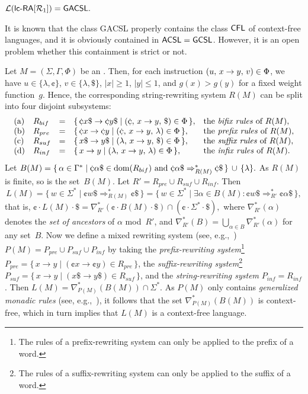 \begin{theorem}\label{PropR1b}
${\mathcal L}(\lcRA[1]) = {\sf GACSL}.$
\end{theorem}

It is known that the class {\sf GACSL} properly contains the class $\textup{\sf CFL}$ of context-free languages, and it is obviously contained in ${\sf ACSL} = \textup{\sf GCSL}$. However, it is an open problem whether this containment is strict or not.
\vspace{+0.1cm}

Let $M = (\Sigma,\Gamma,\Phi)$ be an \lcRA[2']. Then, for each instruction $(u,\,x\rightarrow y,\,v)\in \Phi$, we have $u\in\{\lambda,\cent\}$, $v\in\{\lambda,\$\}$, $|x|\ge 1$, $|y|\le 1$, and $g(x)>g(y)$ for a fixed weight function~$g$. Hence, the corresponding string-rewriting system $R(M)$ can be split into four disjoint subsystems:
$$\begin{array}{llcll}
{\rm (a)} & R_{bif} & = & \{\,\cent x\$ \to \cent y\$ \mid \rarule{\cent}{x}{y}{\$}\in \Phi\,\}, & \textup{the \emph{bifix rules} of }R(M),\\
{\rm (b)} & R_{pre}& = & \{\,\cent x \to \cent y \mid \rarule{\cent}{x}{y}{\lambda}\in \Phi\,\}, & \textup{the \emph{prefix rules} of }R(M),\\
{\rm (c)} & R_{suf}& = & \{\,x\$ \to y\$ \mid \rarule{\lambda}{x}{y}{\$}\in \Phi\,\}, & \textup{the \emph{suffix rules} of }R(M),\\
{\rm (d)} & R_{inf}& = & \{\,x \to y \mid \rarule{\lambda}{x}{y}{\lambda}\in \Phi\,\}, & \textup{the \emph{infix rules} of }R(M).\\
\end{array}$$
Let $B(M) = \{\,\alpha\in\Gamma^*\mid \cent \alpha\$\in {\rm dom}(R_{bif}) \textup{ and }
\cent \alpha\$\Rightarrow_{R(M)}^* \cent \$\,\}\,\cup\,\{\lambda\}.$ As $R(M)$ is finite, so is the set~$B(M)$. Let $R' = R_{pre}\cup R_{suf}\cup R_{inf}$. Then
$$
L(M)  =   \{\,w\in\Sigma^*\mid \cent w\$\Rightarrow_{R(M)}^*\cent\$\,\}
      =   \{\,w\in\Sigma^*\mid \exists \alpha\in B(M):\cent w\$\Rightarrow_{R'}^*\cent \alpha\$\,\},
$$
that is, $\cent\cdot L(M) \cdot \$ = \nabla_{R'}^*(\cent\cdot B(M)\cdot\$) \cap (\cent\cdot\Sigma^*\cdot\$),$ where $\nabla_{R'}^*(\alpha)$ denotes the \emph{set of ancestors} of $\alpha$ mod~$R'$, and $\nabla_{R'}^*(B) = \bigcup_{\alpha\in B}\nabla_{R'}^*(\alpha)$ for any set~$B$. Now we define a mixed rewriting system (see, e.g.,~\cite{Hofbauer2004301}) $P(M)=P_{pre}\cup P_{suf}\cup P_{inf}$ by taking the {\em prefix-rewriting system}\footnote{The rules of a prefix-rewriting system can only be applied to the prefix of a word.} $P_{pre}  =  \{\,x \to  y \mid (\cent x\to \cent y)\in R_{pre}\,\}$, the {\em suffix-rewriting system}\footnote{The rules of a suffix-rewriting system can only be applied to the suffix of a word.} $ P_{suf}  =  \{\,x \to  y \mid (x\$\to y\$)\in R_{suf}\,\}$, and the {\em string-rewriting system}  $P_{inf}  =  R_{inf}$. Then $L(M) = \nabla_{P(M)}^*(B(M))\cap\Sigma^*.$ As $P(M)$ only contains \emph{generalized monadic rules} (see, e.g.,~\cite{Leupold2011}), it follows that the set $\nabla_{P(M)}^*(B(M))$ is context-free, which in turn implies that $L(M)$ is a context-free language.

